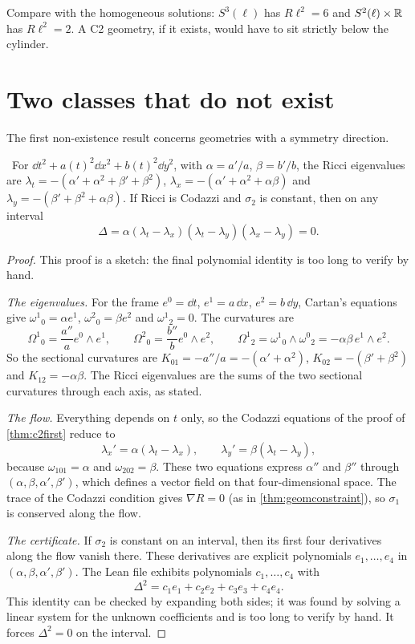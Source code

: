 Compare with the homogeneous solutions: $S^3(\ell)$ has $R\ell^2=6$ and $S^2(\ell)\times\mathbb{R}$ has $R\ell^2=2$. A C2 geometry, if it exists, would have to sit strictly below the cylinder.

\section{Two classes that do not exist}

The first non-existence result concerns geometries with a symmetry direction.

\begin{theorem}\label{thm:diagonal}\ver\nogo\
For $\dd t^2+a(t)^2\dd x^2+b(t)^2\dd y^2$, with $\alpha=a'/a$, $\beta=b'/b$, the Ricci eigenvalues are $\lambda_t=-(\alpha'+\alpha^2+\beta'+\beta^2)$, $\lambda_x=-(\alpha'+\alpha^2+\alpha\beta)$ and $\lambda_y=-(\beta'+\beta^2+\alpha\beta)$. If Ricci is Codazzi and $\sigma_2$ is constant, then on any interval
\[
\Delta=\alpha(\lambda_t-\lambda_x)(\lambda_t-\lambda_y)(\lambda_x-\lambda_y)=0 .
\]
\end{theorem}
\begin{proof}
This proof is a sketch: the final polynomial identity is too long to verify by hand.

\emph{The eigenvalues.} For the frame $e^0=\dd t$, $e^1=a\,\dd x$, $e^2=b\,\dd y$, Cartan's equations give $\omega^1{}_0=\alpha e^1$, $\omega^2{}_0=\beta e^2$ and $\omega^1{}_2=0$. The curvatures are
\[
\Omega^1{}_0=\frac{a''}ae^0\wedge e^1,\qquad\Omega^2{}_0=\frac{b''}be^0\wedge e^2,\qquad\Omega^1{}_2=\omega^1{}_0\wedge\omega^0{}_2=-\alpha\beta\,e^1\wedge e^2 .
\]
So the sectional curvatures are $K_{01}=-a''/a=-(\alpha'+\alpha^2)$, $K_{02}=-(\beta'+\beta^2)$ and $K_{12}=-\alpha\beta$. The Ricci eigenvalues are the sums of the two sectional curvatures through each axis, as stated.

\emph{The flow.} Everything depends on $t$ only, so the Codazzi equations of the proof of \cref{thm:c2first} reduce to
\[
\lambda_x'=\alpha(\lambda_t-\lambda_x),\qquad\lambda_y'=\beta(\lambda_t-\lambda_y),
\]
because $\omega_{101}=\alpha$ and $\omega_{202}=\beta$. These two equations express $\alpha''$ and $\beta''$ through $(\alpha,\beta,\alpha',\beta')$, which defines a vector field on that four-dimensional space. The trace of the Codazzi condition gives $\nabla R=0$ (as in \cref{thm:geomconstraint}), so $\sigma_1$ is conserved along the flow.

\emph{The certificate.} If $\sigma_2$ is constant on an interval, then its first four derivatives along the flow vanish there. These derivatives are explicit polynomials $e_1,\dots,e_4$ in $(\alpha,\beta,\alpha',\beta')$. The Lean file exhibits polynomials $c_1,\dots,c_4$ with
\[
\Delta^2=c_1e_1+c_2e_2+c_3e_3+c_4e_4 .
\]
This identity can be checked by expanding both sides; it was found by solving a linear system for the unknown coefficients and is too long to verify by hand. It forces $\Delta^2=0$ on the interval.
\end{proof}


